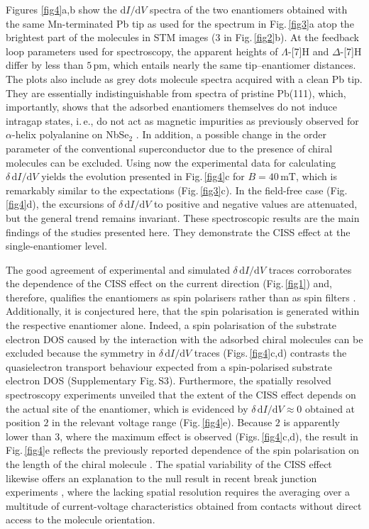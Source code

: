 \documentclass[aps,floatfix,12pt]{revtex4-2}
\begin{document}
Figures \ref{fig4}a,b show the $\text{d}I/\text{d}V$ spectra of the two enantiomers obtained with the same Mn-terminated Pb tip as used for the spectrum in Fig.\,\ref{fig3}a atop the brightest part of the molecules in STM images ($3$ in Fig.\,\ref{fig2}b)\@.
At the feedback loop parameters used for spectroscopy, the apparent heights of $\Lambda$-[7]H and $\Delta$-[7]H differ by less than $5\,\text{pm}$, which entails nearly the same tip--enantiomer distances.
The plots also include as grey dots molecule spectra acquired with a clean Pb tip.
They are essentially indistinguishable from spectra of pristine Pb(111), which, importantly, shows that the adsorbed enantiomers themselves do not induce intragap states, i.\,e., do not act as magnetic impurities as previously observed for $\alpha$-helix polyalanine on NbSe$_2$ \cite{nl_19_5167}.
In addition, a possible change in the order parameter of the conventional superconductor due to the presence of chiral molecules \cite{njp_18_113048} can be excluded.
Using now the experimental data for calculating $\delta\,\text{d}I/\text{d}V$ yields the evolution presented in Fig.\,\ref{fig4}c for $B=40\,\text{mT}$, which is remarkably similar to the expectations (Fig.\,\ref{fig3}c)\@.
In the field-free case (Fig.\,\ref{fig4}d), the excursions of $\delta\,\text{d}I/\text{d}V$ to positive and negative values are attenuated, but the general trend remains invariant.
These spectroscopic results are the main findings of the studies presented here.
They demonstrate the CISS effect at the single-enantiomer level.

The good agreement of experimental and simulated $\delta\,\text{d}I/\text{d}V$ traces corroborates the dependence of the CISS effect on the current direction (Fig.\,\ref{fig1}) and, therefore, qualifies the enantiomers as spin polarisers rather than as spin filters \cite{acsnano_19_42046}.
Additionally, it is conjectured here, that the spin polarisation is generated within the respective enantiomer alone.
Indeed, a spin polarisation of the substrate electron DOS caused by the interaction with the adsorbed chiral molecules \cite{nl_19_5167} can be excluded because the symmetry in $\delta\,\text{d}I/\text{d}V$ traces (Figs.\,\ref{fig4}c,d) contrasts the quasielectron transport behaviour expected from a spin-polarised substrate electron DOS (Supplementary Fig.\,S3)\@.
Furthermore, the spatially resolved spectroscopy experiments unveiled that the extent of the CISS effect depends on the actual site of the enantiomer, which is evidenced by $\delta\,\text{d}I/\text{d}V\approx 0$ obtained at position $2$ in the relevant voltage range (Fig.\,\ref{fig4}e)\@.
Because $2$ is apparently lower than $3$, where the maximum effect is observed (Figs.\,\ref{fig4}c,d), the result in Fig.\,\ref{fig4}e reflects the previously reported dependence of the spin polarisation on the length of the chiral molecule \cite{pccp_15_18357,jpcc_119_14542,jpcc_123_3024,jpcc_124_11716}.
The spatial variability of the CISS effect likewise offers an explanation to the null result in recent break junction experiments \cite{jacs_147_25043}, where the lacking spatial resolution requires the averaging over a multitude of current-voltage characteristics obtained from contacts without direct access to the molecule orientation.
\end{document}
